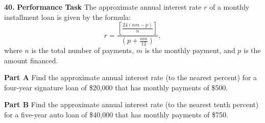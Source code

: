 \documentclass{article}
\newenvironment{practice}[2]{\textbf{#1.}}{\vspace{1em}}
\newcommand{\answer}[1]{}
\newcommand{\uncertain}[2]{#1}
\begin{document}
\begin{practice}{40}{\uncertain{?}{missing DOK}}
\textbf{Performance Task} The approximate annual interest rate $r$ of a monthly installment loan is given by the formula:
$$ r = \frac{\left[\frac{24(nm - p)}{n}\right]}{\left(p + \frac{nm}{12}\right)}, $$
where $n$ is the total number of payments, $m$ is the monthly payment, and $p$ is the amount financed.

\textbf{Part A} Find the approximate annual interest rate (to the nearest percent) for a four-year signature loan of \$20,000 that has monthly payments of \$500.

\textbf{Part B} Find the approximate annual interest rate (to the nearest tenth percent) for a five-year auto loan of \$40,000 that has monthly payments of \$750.
\answer{}
\end{practice}
\end{document}
